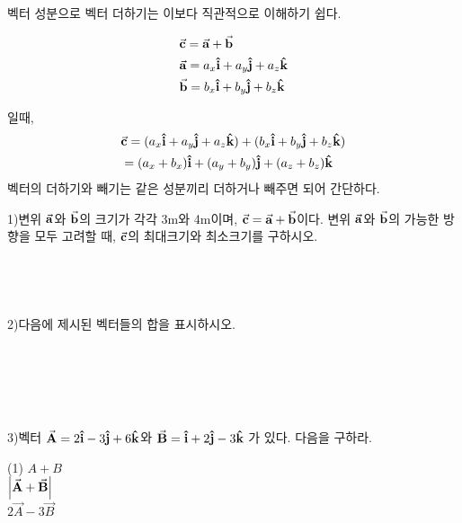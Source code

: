 \begin{flushleft}
  벡터 성분으로 벡터 더하기는 이보다 직관적으로 이해하기 쉽다.


 \begin{align}
  & \va{c}= \va{a}+\va{b} \\
  & \va{a}= a_x\vu{i}+a_y\vu{j}+a_z\vu{k} \\
  & \va{b}= b_x\vu{i}+b_y\vu{j}+b_z\vu{k} 
   \end{align}

  일때, 
  \begin{align}
    &\va{c}= (a_x\vu{i}+a_y\vu{j}+a_z\vu{k}) + (b_x\vu{i}+b_y\vu{j}+b_z\vu{k}) \\
    &= (a_x+b_x)\vu{i}+(a_y+b_y)\vu{j}+(a_z+b_z)\vu{k}
    \end{align}
벡터의 더하기와 빼기는 같은 성분끼리 더하거나 빼주면 되어 간단하다. 
\newpage



  \begin{task}

1)변위 $\va{a}$와 $\va{b}$의 크기가 각각 3m와 4m이며, $\va{c}=\va{a}+\va{b}$이다. 
변위 $\va{a}$와 $\va{b}$의 가능한 방향을 모두 고려할 때, $\va{c}$의 최대크기와 최소크기를 구하시오.\\
\phantom{text}\\
\phantom{text}\\
\phantom{text}\\
\phantom{text}\\
2)다음에 제시된 벡터들의 합을 표시하시오.\\
\phantom{text}\\


    \phantom{text}\\
    \phantom{text}\\
    \phantom{text}\\

\begin{flushleft}
3)벡터 $\va{A}= 2\vu{i}-3\vu{j}+6\vu{k}$와 $\va{B}= \vu{i}+2\vu{j}-3\vu{k}$ 가 있다. 다음을 구하라.
    \\
    \begin{tasks}[label=(\arabic*)](1)
      \task $A+B$ \\
      \task $\abs{\va{A}+\va{B}}$\\
      \task $2\vec{A}-3\vec{B}$  \\
   \end{tasks}
  \end{flushleft}


\end{task}
\end{flushleft}
